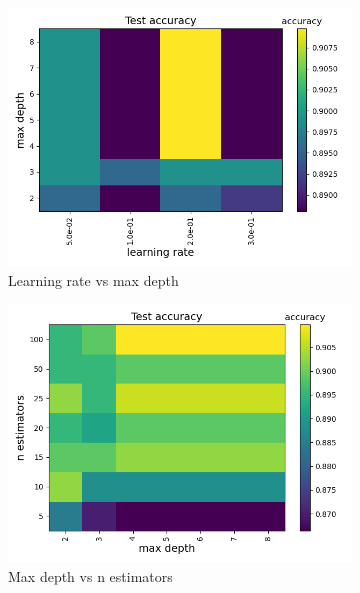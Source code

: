 \documentclass[a4paper]{article}
\begin{document}
\begin{figure}[H]
  \centering
  \begin{subfigure}{0.49\textwidth}
    \includegraphics[scale=0.45]{../figures/xgboost/heatmaps/heatmap_nbins200_pca0_seed4155_ts0.20_accuracy_learning_rate_max_depth.png}
    \caption{Learning rate vs max depth}
  \end{subfigure}
  \begin{subfigure}{0.49\textwidth}
    \includegraphics[scale=0.45]{../figures/xgboost/heatmaps/heatmap_nbins200_pca0_seed4155_ts0.20_accuracy_max_depth_n_estimators.png}
    \caption{Max depth vs n estimators}
  \end{subfigure}\\
  \begin{subfigure}{0.49\textwidth}

\end{subfigure}
\end{figure}
\end{document}
